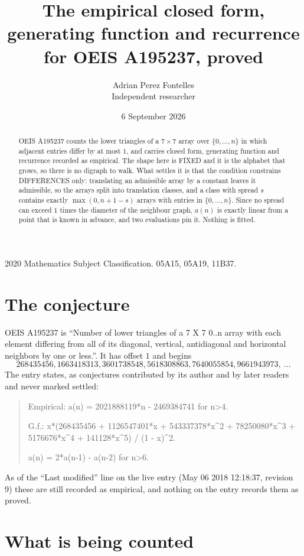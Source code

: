 \documentclass[11pt,a4paper]{article}
\title{The empirical closed form, generating function and recurrence for OEIS A195237, proved}
\author{Adrian Perez Fontelles\\ \small Independent researcher}
\date{6 September 2026}
\theoremstyle{plain}
\theoremstyle{definition}
\begin{document}
\maketitle

\begin{abstract}
OEIS A195237 counts the lower triangles of a $7\times7$ array over $\{0,\dots,n\}$ in which
adjacent entries differ by at most $1$, and carries closed form, generating function and recurrence recorded as empirical. The shape here is FIXED
and it is the alphabet that grows, so there is no digraph to walk. What settles it is that the
condition constrains DIFFERENCES only: translating an admissible array by a constant leaves it
admissible, so the arrays split into translation classes, and a class with spread $s$ contains
exactly $\max(0,n+1-s)$ arrays with entries in $\{0,\dots,n\}$. Since no spread can exceed
$1$ times the diameter of the neighbour graph, $a(n)$ is exactly linear from a point that is
known in advance, and two evaluations pin it. Nothing is fitted.
\end{abstract}

\noindent\small 2020 Mathematics Subject Classification. 05A15, 05A19, 11B37.\normalsize

\section{The conjecture}

OEIS A195237 is ``Number of lower triangles of a 7 X 7 0..n array with each element differing from all of its diagonal, vertical, antidiagonal and horizontal neighbors by one or less.''. It has offset $1$ and begins
\[
268435456, 1663418313, 3601738548, 5618308863, 7640055854, 9661943973,\ \dots
\]
The entry states, as conjectures contributed by its author and by later readers and never
marked settled:
\begin{quote}
Empirical: a(n) = 2021888119*n - 2469384741 for n>4.

G.f.: x*(268435456 + 1126547401*x + 543337378*x\^{}2 + 78250080*x\^{}3 + 5176676*x\^{}4 + 141128*x\^{}5) / (1 - x)\^{}2.

a(n) = 2*a(n-1) - a(n-2) for n>6.
\end{quote}
As of the ``Last modified'' line on the live entry (May 06 2018 12:18:37, revision 9) these are still
recorded as empirical, and nothing on the entry records them as proved.

\section{What is being counted}
\end{document}
